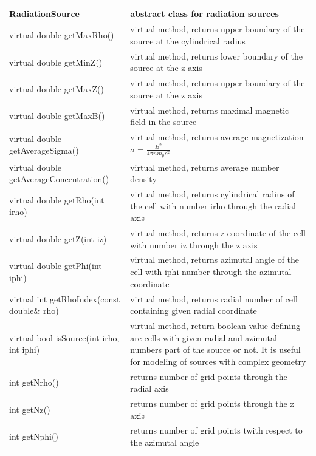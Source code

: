 \begin{small}
	\label{sourceMethods1}
	\begin{xtabular}{|p{0.5\textwidth}|p{0.5\textwidth}|}
		\hline
		\textbf{RadiationSource} & abstract class for radiation sources\\
		\hline
		virtual double getMaxRho() & virtual method, returns upper boundary of the source at the cylindrical radius\\
		\hline
		virtual double getMinZ() & virtual method, returns lower boundary of the source at the z axis\\
		\hline
		virtual double getMaxZ() & virtual method, returns upper boundary of the source at the z axis\\
		\hline
		virtual double getMaxB() & virtual method, returns maximal magnetic field in the source\\
		\hline
		virtual double getAverageSigma() & virtual method, returns average magnetization $\sigma=\frac{B^2}{4\pi n m_p c^2}$\\
		\hline
		virtual double getAverageConcentration() & virtual method, returns average number density\\
		\hline
		virtual double getRho(int irho) & virtual method, returns cylindrical radius of the cell with number irho through the radial axis\\
		\hline
		virtual double getZ(int iz)& virtual method, returns z coordinate of the cell with number iz through the z axis\\
		\hline
		virtual double getPhi(int iphi)& virtual method, returns azimutal angle of the cell with iphi number through the azimutal coordinate\\
		\hline
		virtual int getRhoIndex(const double\& rho)& virtual method, returns radial number of cell containing given radial coordinate\\
		\hline
		virtual bool isSource(int irho, int iphi)& virtual method, return boolean value defining are cells with given radial and azimutal numbers part of the source or not. It is useful for modeling of sources with complex geometry \\
		\hline
		int getNrho() & returns number of grid points through the radial axis\\
		\hline
		int getNz() & returns number of grid points through the z axis\\
		\hline
		int getNphi() & returns number of grid points twith respect to the azimutal angle\\

\end{xtabular}
\end{small}
